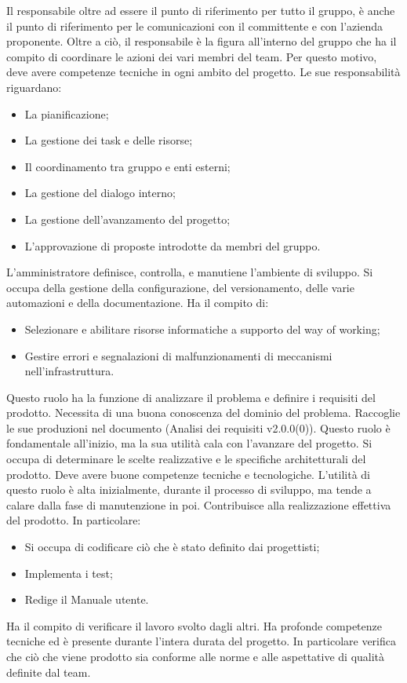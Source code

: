 \documentclass[10pt, a4paper]{article}
\begin{document}
Il responsabile oltre ad essere il punto di riferimento per tutto il gruppo, è anche il punto di riferimento per le comunicazioni con il committente e con l'azienda proponente. Oltre a ciò, il responsabile è la figura all'interno del gruppo che ha il compito di coordinare le azioni dei vari membri del team. Per questo motivo, deve avere competenze tecniche in ogni ambito del progetto.
Le sue responsabilità riguardano:
\begin{itemize}
    \item La pianificazione;
    \item La gestione dei task e delle risorse;
    \item Il coordinamento tra gruppo e enti esterni;
    \item La gestione del dialogo interno;
    \item La gestione dell'avanzamento del progetto;
    \item L'approvazione di proposte introdotte da membri del gruppo.
\end{itemize}
L'amministratore definisce, controlla, e manutiene l'ambiente di sviluppo. Si occupa della gestione della configurazione, del versionamento, delle varie automazioni e della documentazione.
Ha il compito di:
\begin{itemize}
    \item Selezionare e abilitare risorse informatiche a supporto del way of working;
    \item Gestire errori e segnalazioni di malfunzionamenti di meccanismi nell'infrastruttura.
\end{itemize}
Questo ruolo ha la funzione di analizzare il problema e definire i requisiti del prodotto. Necessita di una buona conoscenza del dominio del problema. Raccoglie le sue produzioni nel documento (Analisi dei requisiti v2.0.0(0)).
Questo ruolo è fondamentale all'inizio, ma la sua utilità cala con l'avanzare del progetto. 
Si occupa di determinare le scelte realizzative e le specifiche architetturali del prodotto. Deve avere buone competenze tecniche e tecnologiche. L'utilità di questo ruolo è alta inizialmente, durante il processo di sviluppo, ma tende a calare dalla fase di manutenzione in poi.
Contribuisce alla realizzazione effettiva del prodotto.
In particolare:
\begin{itemize}
    \item Si occupa di codificare ciò che è stato definito dai progettisti;
    \item Implementa i test;
    \item Redige il Manuale utente.
\end{itemize}
Ha il compito di verificare il lavoro svolto dagli altri.
Ha profonde competenze tecniche ed è presente durante l'intera durata del progetto.
In particolare verifica che ciò che viene prodotto sia conforme alle norme e alle aspettative di qualità definite dal team.
\end{document}
